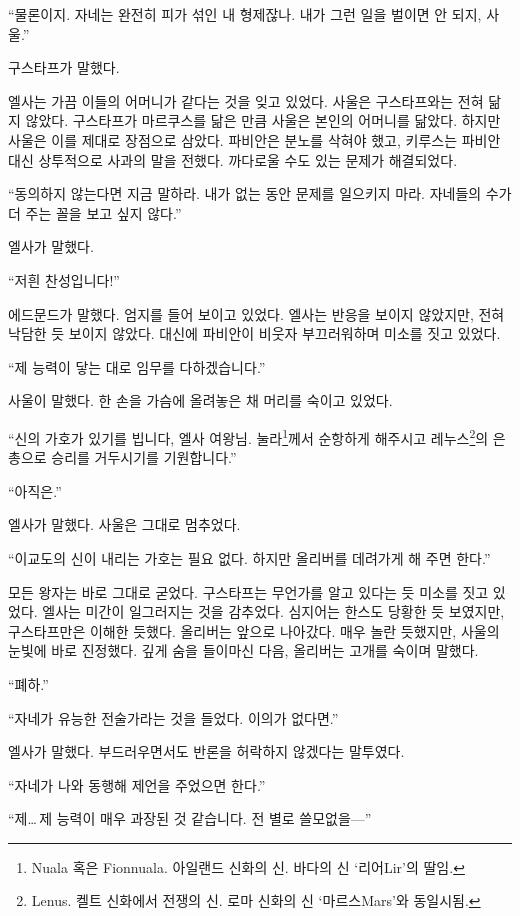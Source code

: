 ``물론이지. 자네는 완전히 피가 섞인 내 형제잖나. 내가 그런 일을 벌이면 안 되지, 사울.''

구스타프가 말했다.

엘사는 가끔 이들의 어머니가 같다는 것을 잊고 있었다. 사울은 구스타프와는 전혀 닮지 않았다. 구스타프가 마르쿠스를 닮은 만큼 사울은 본인의 어머니를 닮았다. 하지만 사울은 이를 제대로 장점으로 삼았다. 파비안은 분노를 삭혀야 했고, 키루스는 파비안 대신 상투적으로 사과의 말을 전했다. 까다로울 수도 있는 문제가 해결되었다.

``동의하지 않는다면 지금 말하라. 내가 없는 동안 문제를 일으키지 마라. 자네들의 수가 더 주는 꼴을 보고 싶지 않다.''

엘사가 말했다.

``저흰 찬성입니다!''

에드문드가 말했다. 엄지를 들어 보이고 있었다. 엘사는 반응을 보이지 않았지만, 전혀 낙담한 듯 보이지 않았다. 대신에 파비안이 비웃자 부끄러워하며 미소를 짓고 있었다.

``제 능력이 닿는 대로 임무를 다하겠습니다.''

사울이 말했다. 한 손을 가슴에 올려놓은 채 머리를 숙이고 있었다.

``신의 가호가 있기를 빕니다, 엘사 여왕님. 눌라\footnote{Nuala 혹은 Fionnuala. 아일랜드 신화의 신. 바다의 신 `리어Lir'의 딸임.}께서 순항하게 해주시고 레누스\footnote{Lenus. 켈트 신화에서 전쟁의 신. 로마 신화의 신 `마르스Mars'와 동일시됨.}의 은총으로 승리를 거두시기를 기원합니다.''

``아직은.''

엘사가 말했다. 사울은 그대로 멈추었다.

``이교도의 신이 내리는 가호는 필요 없다. 하지만 올리버를 데려가게 해 주면 한다.''

모든 왕자는 바로 그대로 굳었다. 구스타프는 무언가를 알고 있다는 듯 미소를 짓고 있었다. 엘사는 미간이 일그러지는 것을 감추었다. 심지어는 한스도 당황한 듯 보였지만, 구스타프만은 이해한 듯했다. 올리버는 앞으로 나아갔다. 매우 놀란 듯했지만, 사울의 눈빛에 바로 진정했다. 깊게 숨을 들이마신 다음, 올리버는 고개를 숙이며 말했다.

``폐하.''

``자네가 유능한 전술가라는 것을 들었다. 이의가 없다면.''

엘사가 말했다. 부드러우면서도 반론을 허락하지 않겠다는 말투였다.

``자네가 나와 동행해 제언을 주었으면 한다.''

``제\ldots\,제 능력이 매우 과장된 것 같습니다. 전 별로 쓸모없을—''

